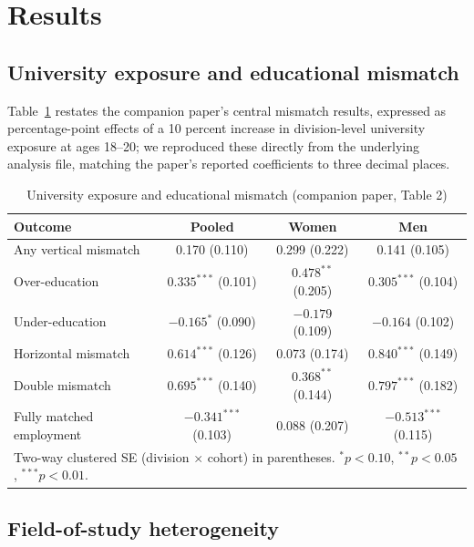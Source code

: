 \documentclass[11pt]{article}
\begin{document}
\section{Results}

\subsection{University exposure and educational mismatch}

Table~\ref{tab:mismatch} restates the companion paper's central mismatch results, expressed as percentage-point effects of a 10 percent increase in division-level university exposure at ages 18--20; we reproduced these directly from the underlying analysis file, matching the paper's reported coefficients to three decimal places.

\begin{table}[htbp]
\centering
\caption{University exposure and educational mismatch (companion paper, Table 2)}
\label{tab:mismatch}
\begin{tabular}{lccc}
\toprule
Outcome & Pooled & Women & Men \\
\midrule
Any vertical mismatch      & 0.170 (0.110)      & 0.299 (0.222)      & 0.141 (0.105) \\
Over-education             & $0.335^{***}$ (0.101) & $0.478^{**}$ (0.205) & $0.305^{***}$ (0.104) \\
Under-education            & $-0.165^{*}$ (0.090)  & $-0.179$ (0.109)     & $-0.164$ (0.102) \\
Horizontal mismatch        & $0.614^{***}$ (0.126) & $0.073$ (0.174)      & $0.840^{***}$ (0.149) \\
Double mismatch            & $0.695^{***}$ (0.140) & $0.368^{**}$ (0.144)  & $0.797^{***}$ (0.182) \\
Fully matched employment   & $-0.341^{***}$ (0.103) & $0.088$ (0.207)     & $-0.513^{***}$ (0.115) \\
\bottomrule
\multicolumn{4}{p{0.9\textwidth}}{\footnotesize Two-way clustered SE (division $\times$ cohort) in parentheses. $^{*}p<0.10$, $^{**}p<0.05$, $^{***}p<0.01$.}
\end{tabular}
\end{table}

\subsection{Field-of-study heterogeneity}
\label{sec:fieldhet}
\end{document}
